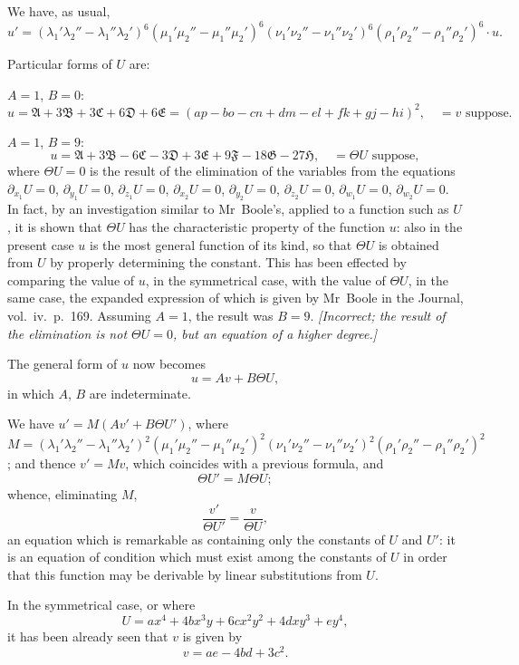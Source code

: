 \documentclass[11pt,a4paper]{book}
\begin{document}
\newpage
We have, as usual,
\[
u' = (\lambda_1'\lambda_2'' - \lambda_1''\lambda_2')^6 (\mu_1'\mu_2'' - \mu_1''\mu_2')^6 (\nu_1'\nu_2'' - \nu_1''\nu_2')^6 (\rho_1'\rho_2'' - \rho_1''\rho_2')^6 \cdot u.
\]

Particular forms of $U$ are:

$A=1$, $B=0$:
\[
u = \mathfrak{A} + 3\mathfrak{B} + 3\mathfrak{C} + 6\mathfrak{D} + 6\mathfrak{E} = (ap - bo - cn + dm - el + fk + gj - hi)^2, \quad = v \text{ suppose}.
\]

$A=1$, $B=9$:
\[
u = \mathfrak{A} + 3\mathfrak{B} - 6\mathfrak{C} - 3\mathfrak{D} + 3\mathfrak{E} + 9\mathfrak{F} - 18\mathfrak{G} - 27\mathfrak{H}, \quad = \Theta U \text{ suppose},
\]
where $\Theta U = 0$ is the result of the elimination of the variables from the equations
$\partial_{x_1}U=0$, $\partial_{y_1}U=0$, $\partial_{z_1}U=0$, $\partial_{x_2}U=0$, $\partial_{y_2}U=0$, $\partial_{z_2}U=0$, $\partial_{w_1}U=0$, $\partial_{w_2}U=0$. In fact, by
an investigation similar to Mr~Boole's, applied to a function such as $U$, it is shown
that $\Theta U$ has the characteristic property of the function $u$: also in the present case
$u$ is the most general function of its kind, so that $\Theta U$ is obtained from $U$ by
properly determining the constant. This has been effected by comparing the value of
$u$, in the symmetrical case, with the value of $\Theta U$, in the same case, the expanded
expression of which is given by Mr~Boole in the Journal, vol.~iv.\ p.~169. Assuming
$A=1$, the result was $B=9$. \textit{[Incorrect; the result of the elimination is not $\Theta U = 0$,
but an equation of a higher degree.]}

The general form of $u$ now becomes
\[
u = Av + B\Theta U,
\]
in which $A$, $B$ are indeterminate.

We have $u' = M(Av' + B\Theta U')$,
where $M = (\lambda_1'\lambda_2'' - \lambda_1''\lambda_2')^2 (\mu_1'\mu_2'' - \mu_1''\mu_2')^2 (\nu_1'\nu_2'' - \nu_1''\nu_2')^2 (\rho_1'\rho_2'' - \rho_1''\rho_2')^2$;
and thence $v' = Mv$,
which coincides with a previous formula, and
\[
\Theta U' = M \Theta U;
\]
whence, eliminating $M$,
\[
\frac{v'}{\Theta U'} = \frac{v}{\Theta U},
\]
an equation which is remarkable as containing only the constants of $U$ and $U'$: it is
an equation of condition which must exist among the constants of $U$ in order that
this function may be derivable by linear substitutions from $U$.

In the symmetrical case, or where
\[
U = ax^4 + 4bx^3y + 6cx^2y^2 + 4dxy^3 + ey^4,
\]
it has been already seen that $v$ is given by
\[
v = ae - 4bd + 3c^2.
\]
\end{document}

